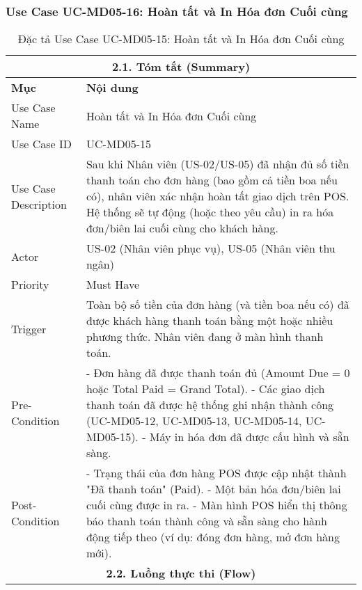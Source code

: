 \subsubsection{Use Case UC-MD05-16: Hoàn tất và In Hóa đơn Cuối cùng}
\begin{longtable}{|m{4cm}|p{11cm}|}
\caption{Đặc tả Use Case UC-MD05-15: Hoàn tất và In Hóa đơn Cuối cùng} \label{tab:uc_md05_15_final} \\
\hline
\multicolumn{2}{|c|}{\textbf{2.1. Tóm tắt (Summary)}} \\
\hline
\textbf{Mục} & \textbf{Nội dung} \\
\hline
\endhead %
\hline
\endfoot %
\hline
\endlastfoot %
Use Case Name & Hoàn tất và In Hóa đơn Cuối cùng \\
\hline
Use Case ID & UC-MD05-15 \\
\hline
Use Case Description & Sau khi Nhân viên (US-02/US-05) đã nhận đủ số tiền thanh toán cho đơn hàng (bao gồm cả tiền boa nếu có), nhân viên xác nhận hoàn tất giao dịch trên POS. Hệ thống sẽ tự động (hoặc theo yêu cầu) in ra hóa đơn/biên lai cuối cùng cho khách hàng. \\
\hline
Actor & US-02 (Nhân viên phục vụ), US-05 (Nhân viên thu ngân) \\
\hline
Priority & Must Have \\
\hline
Trigger & Toàn bộ số tiền của đơn hàng (và tiền boa nếu có) đã được khách hàng thanh toán bằng một hoặc nhiều phương thức. Nhân viên đang ở màn hình thanh toán. \\
\hline
Pre-Condition & - Đơn hàng đã được thanh toán đủ (Amount Due = 0 hoặc Total Paid = Grand Total). \newline - Các giao dịch thanh toán đã được hệ thống ghi nhận thành công (UC-MD05-12, UC-MD05-13, UC-MD05-14, UC-MD05-15). \newline - Máy in hóa đơn đã được cấu hình và sẵn sàng. \\
\hline
Post-Condition & - Trạng thái của đơn hàng POS được cập nhật thành "Đã thanh toán" (Paid). \newline - Một bản hóa đơn/biên lai cuối cùng được in ra. \newline - Màn hình POS hiển thị thông báo thanh toán thành công và sẵn sàng cho hành động tiếp theo (ví dụ: đóng đơn hàng, mở đơn hàng mới). \\
\hline
\multicolumn{2}{|c|}{\textbf{2.2. Luồng thực thi (Flow)}} \\

\end{longtable}
